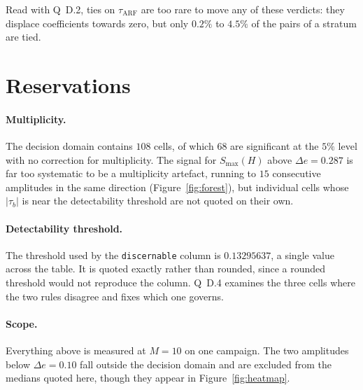 \documentclass[11pt,a4paper]{article}
\begin{document}
Read with Q~D.2, ties on $\tau_{\mathrm{ARF}}$ are too rare to move any of these verdicts:
they displace coefficients towards zero, but only $0.2\%$ to $4.5\%$ of the pairs of a
stratum are tied.

\section{Reservations}

\paragraph{Multiplicity.} The decision domain contains $108$ cells, of which $68$ are
significant at the $5\%$ level with no correction for multiplicity. The signal for
$S_{\max}(H)$ above $\Delta e = 0.287$ is far too systematic to be a multiplicity artefact,
running to $15$ consecutive amplitudes in the same direction (Figure~\ref{fig:forest}), but individual cells whose
$|\tau_b|$ is near the detectability threshold are not quoted on their own.

\paragraph{Detectability threshold.} The threshold used by the \texttt{discernable} column
is $0.13295637$, a single value across the table. It is quoted exactly rather than rounded,
since a rounded threshold would not reproduce the column. Q~D.4 examines the three cells
where the two rules disagree and fixes which one governs.

\paragraph{Scope.} Everything above is measured at $M = 10$ on one campaign. The two
amplitudes below $\Delta e = 0.10$ fall outside the decision domain and are excluded from
the medians quoted here, though they appear in Figure~\ref{fig:heatmap}.
\end{document}
